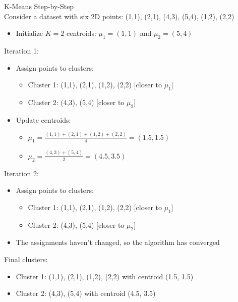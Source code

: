 \begin{example2}{K-Means Step-by-Step}\\
Consider a dataset with six 2D points: (1,1), (2,1), (4,3), (5,4), (1,2), (2,2)
\begin{itemize}
    \item Initialize $K=2$ centroids: $\mu_1 = (1,1)$ and $\mu_2 = (5,4)$
\end{itemize}
\tcblower
Iteration 1:
\begin{itemize}
    \item Assign points to clusters:
    \begin{itemize}
        \item Cluster 1: (1,1), (2,1), (1,2), (2,2) [closer to $\mu_1$]
        \item Cluster 2: (4,3), (5,4) [closer to $\mu_2$]
    \end{itemize}
    \item Update centroids:
    \begin{itemize}
        \item $\mu_1 = \frac{(1,1) + (2,1) + (1,2) + (2,2)}{4} = (1.5, 1.5)$
        \item $\mu_2 = \frac{(4,3) + (5,4)}{2} = (4.5, 3.5)$
    \end{itemize}
\end{itemize}

Iteration 2:
\begin{itemize}
    \item Assign points to clusters:
    \begin{itemize}
        \item Cluster 1: (1,1), (2,1), (1,2), (2,2) [closer to $\mu_1$]
        \item Cluster 2: (4,3), (5,4) [closer to $\mu_2$]
    \end{itemize}
    \item The assignments haven't changed, so the algorithm has converged
\end{itemize}

Final clusters:
\begin{itemize}
    \item Cluster 1: (1,1), (2,1), (1,2), (2,2) with centroid (1.5, 1.5)
    \item Cluster 2: (4,3), (5,4) with centroid (4.5, 3.5)
\end{itemize}
\end{example2}

